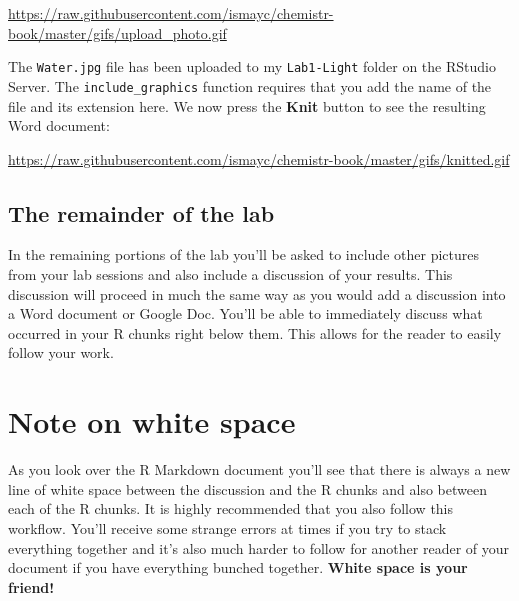 \documentclass[]{tufte-book}
\begin{document}
\vspace{0.1in}

\begin{center}\footnotesize{\url{https://raw.githubusercontent.com/ismayc/chemistr-book/master/gifs/upload_photo.gif}}\end{center}

\vspace{0.1in}

The \texttt{Water.jpg} file has been uploaded to my \texttt{Lab1-Light}
folder on the RStudio Server. The \texttt{include\_graphics} function
requires that you add the name of the file and its extension here. We
now press the \textbf{Knit} button to see the resulting Word document:

\vspace{0.1in}

\begin{center}\footnotesize{\url{https://raw.githubusercontent.com/ismayc/chemistr-book/master/gifs/knitted.gif}}\end{center}

\vspace{0.1in}

\subsection{The remainder of the lab}\label{the-remainder-of-the-lab}

In the remaining portions of the lab you'll be asked to include other
pictures from your lab sessions and also include a discussion of your
results. This discussion will proceed in much the same way as you would
add a discussion into a Word document or Google Doc. You'll be able to
immediately discuss what occurred in your R chunks right below them.
This allows for the reader to easily follow your work.

\section{Note on white space}\label{note-on-white-space}

As you look over the R Markdown document you'll see that there is always
a new line of white space between the discussion and the R chunks and
also between each of the R chunks. It is highly recommended that you
also follow this workflow. You'll receive some strange errors at times
if you try to stack everything together and it's also much harder to
follow for another reader of your document if you have everything
bunched together. \textbf{White space is your friend!}
\end{document}
